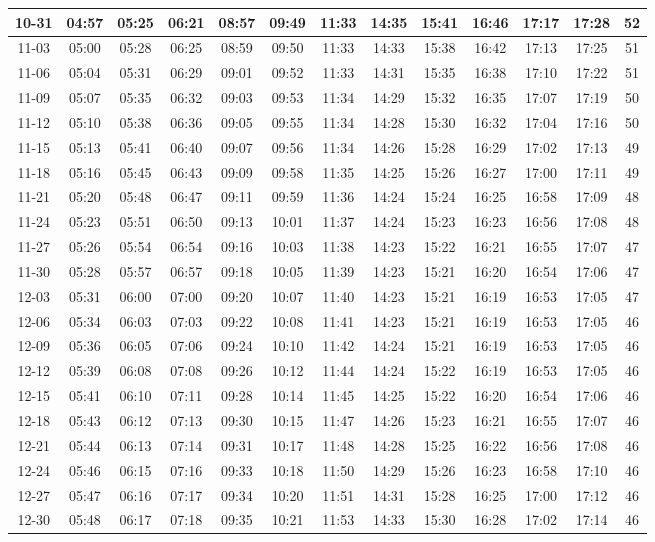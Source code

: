 \begin{footnotesize}
\begin{longtable}{c | c | c | c | c | c | c | c | c | c | c | c | c}
		10-31&04:57&05:25&06:21&08:57&09:49&11:33&14:35&15:41&16:46&17:17&17:28&52\\\hline
		11-03&05:00&05:28&06:25&08:59&09:50&11:33&14:33&15:38&16:42&17:13&17:25&51\\\hline
		11-06&05:04&05:31&06:29&09:01&09:52&11:33&14:31&15:35&16:38&17:10&17:22&51\\\hline
		11-09&05:07&05:35&06:32&09:03&09:53&11:34&14:29&15:32&16:35&17:07&17:19&50\\\hline
		11-12&05:10&05:38&06:36&09:05&09:55&11:34&14:28&15:30&16:32&17:04&17:16&50\\\hline
		11-15&05:13&05:41&06:40&09:07&09:56&11:34&14:26&15:28&16:29&17:02&17:13&49\\\hline
		11-18&05:16&05:45&06:43&09:09&09:58&11:35&14:25&15:26&16:27&17:00&17:11&49\\\hline
		11-21&05:20&05:48&06:47&09:11&09:59&11:36&14:24&15:24&16:25&16:58&17:09&48\\\hline
		11-24&05:23&05:51&06:50&09:13&10:01&11:37&14:24&15:23&16:23&16:56&17:08&48\\\hline
		11-27&05:26&05:54&06:54&09:16&10:03&11:38&14:23&15:22&16:21&16:55&17:07&47\\\hline
		11-30&05:28&05:57&06:57&09:18&10:05&11:39&14:23&15:21&16:20&16:54&17:06&47\\\hline
		12-03&05:31&06:00&07:00&09:20&10:07&11:40&14:23&15:21&16:19&16:53&17:05&47\\\hline
		12-06&05:34&06:03&07:03&09:22&10:08&11:41&14:23&15:21&16:19&16:53&17:05&46\\\hline
		12-09&05:36&06:05&07:06&09:24&10:10&11:42&14:24&15:21&16:19&16:53&17:05&46\\\hline
		12-12&05:39&06:08&07:08&09:26&10:12&11:44&14:24&15:22&16:19&16:53&17:05&46\\\hline
		12-15&05:41&06:10&07:11&09:28&10:14&11:45&14:25&15:22&16:20&16:54&17:06&46\\\hline
		12-18&05:43&06:12&07:13&09:30&10:15&11:47&14:26&15:23&16:21&16:55&17:07&46\\\hline
		12-21&05:44&06:13&07:14&09:31&10:17&11:48&14:28&15:25&16:22&16:56&17:08&46\\\hline
		12-24&05:46&06:15&07:16&09:33&10:18&11:50&14:29&15:26&16:23&16:58&17:10&46\\\hline
		12-27&05:47&06:16&07:17&09:34&10:20&11:51&14:31&15:28&16:25&17:00&17:12&46\\\hline
		12-30&05:48&06:17&07:18&09:35&10:21&11:53&14:33&15:30&16:28&17:02&17:14&46\\\hline
\end{longtable}\end{footnotesize}